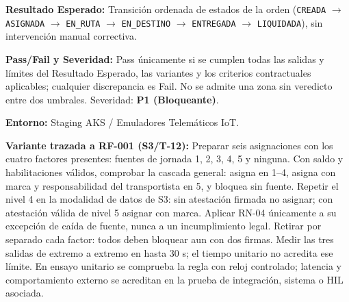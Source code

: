 \par\noindent\textbf{Resultado Esperado:} Transición ordenada de estados de la orden (\texttt{C\allowbreak{}R\allowbreak{}E\allowbreak{}A\allowbreak{}D\allowbreak{}A\allowbreak{}} \(\rightarrow\) \texttt{A\allowbreak{}S\allowbreak{}I\allowbreak{}G\allowbreak{}N\allowbreak{}A\allowbreak{}D\allowbreak{}A\allowbreak{}} \(\rightarrow\) \texttt{E\allowbreak{}N\allowbreak{}\_\allowbreak{}R\allowbreak{}U\allowbreak{}T\allowbreak{}A\allowbreak{}} \(\rightarrow\) \texttt{E\allowbreak{}N\allowbreak{}\_\allowbreak{}D\allowbreak{}E\allowbreak{}S\allowbreak{}T\allowbreak{}I\allowbreak{}N\allowbreak{}O\allowbreak{}} \(\rightarrow\) \texttt{E\allowbreak{}N\allowbreak{}T\allowbreak{}R\allowbreak{}E\allowbreak{}G\allowbreak{}A\allowbreak{}D\allowbreak{}A\allowbreak{}} \(\rightarrow\) \texttt{L\allowbreak{}I\allowbreak{}Q\allowbreak{}U\allowbreak{}I\allowbreak{}D\allowbreak{}A\allowbreak{}D\allowbreak{}A\allowbreak{}}), sin intervención manual correctiva.\par
\par\noindent\textbf{Pass/Fail y Severidad:} Pass únicamente si se cumplen todas las salidas y límites del Resultado Esperado, las variantes y los criterios contractuales aplicables; cualquier discrepancia es Fail. No se admite una zona sin veredicto entre dos umbrales. Severidad: \textbf{P1 (Bloqueante)}.\par
\par\noindent\textbf{Entorno:} Staging AKS / Emuladores Telemáticos IoT.\par







\par\noindent\textbf{Variante trazada a RF-001 (S3/T-12):} Preparar seis asignaciones con los cuatro factores presentes: fuentes de jornada 1, 2, 3, 4, 5 y ninguna. Con saldo y habilitaciones válidos, comprobar la cascada general: asigna en 1–4, asigna con marca y responsabilidad del transportista en 5, y bloquea sin fuente. Repetir el nivel 4 en la modalidad de datos de S3: sin atestación firmada no asignar; con atestación válida de nivel 5 asignar con marca. Aplicar RN-04 únicamente a su excepción de caída de fuente, nunca a un incumplimiento legal. Retirar por separado cada factor: todos deben bloquear aun con dos firmas. Medir las tres salidas de extremo a extremo en hasta 30 s; el tiempo unitario no acredita ese límite. En ensayo unitario se comprueba la regla con reloj controlado; latencia y comportamiento externo se acreditan en la prueba de integración, sistema o HIL asociada.\par


